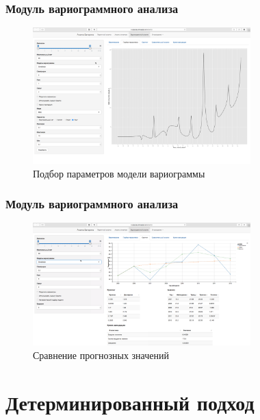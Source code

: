 \documentclass[10pt,pdf,aspectratio=169,hyperref={unicode}]{beamer}
\begin{document}
\begin{frame}
  \frametitle{Модуль вариограммного анализа}
    \begin{figure}[h]
    \includegraphics[width=0.75\textwidth]{../../figures/static/5_fit.png}
    \caption{Подбор параметров модели вариограммы}
  \end{figure}
\end{frame}

\begin{frame}
  \frametitle{Модуль вариограммного анализа}
    \begin{figure}[h]
    \includegraphics[width=0.75\textwidth]{../../figures/static/6_krige.png}
    \caption{Сравнение прогнозных значений}
  \end{figure}
\end{frame}

\section{Детерминированный подход}
\end{document}
